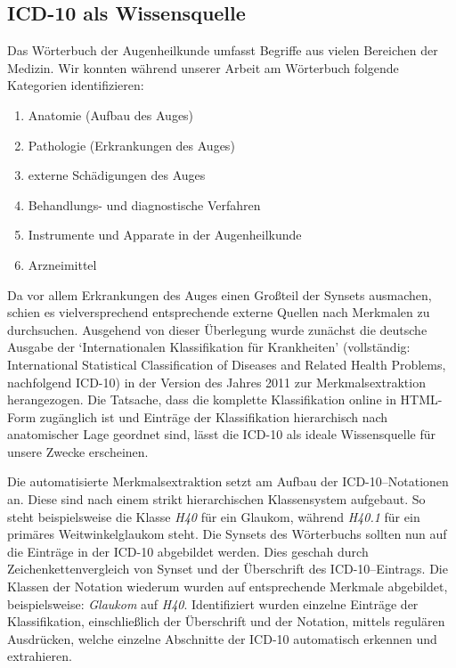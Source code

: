 \documentclass[pagesize,DIV=calc,12pt,draft]{scrreprt}
\begin{document}
\subsection{ICD-10 als Wissensquelle}

Das Wörterbuch der Augenheilkunde umfasst Begriffe aus vielen Bereichen der Medizin. 
Wir konnten während unserer Arbeit am Wörterbuch folgende Kategorien identifizieren: 

\begin{enumerate}
\item
 Anatomie (Aufbau des Auges)
\item
 Pathologie (Erkrankungen des Auges)
\item
 externe Schädigungen des Auges
\item
 Behandlungs- und diagnostische Verfahren
\item
 Instrumente und Apparate in der Augenheilkunde
\item
 Arzneimittel
\end{enumerate}

Da vor allem Erkrankungen des Auges einen Großteil der Synsets ausmachen, schien es vielversprechend entsprechende externe Quellen nach Merkmalen zu durchsuchen. 
Ausgehend von dieser Überlegung wurde zunächst die deutsche Ausgabe der `Internationalen Klassifikation für Krankheiten' (vollständig: International Statistical Classification of Diseases and Related Health Problems, nachfolgend ICD-10) in der Version des Jahres 2011 zur Merkmalsextraktion herangezogen. 
Die Tatsache, dass die komplette Klassifikation online in HTML-Form zugänglich ist und Einträge der Klassifikation hierarchisch nach anatomischer Lage geordnet sind, lässt die ICD-10 als ideale Wissensquelle für unsere Zwecke erscheinen. 

Die automatisierte Merkmalsextraktion setzt am Aufbau der ICD-10--Notationen an. 
Diese sind nach einem strikt hierarchischen Klassensystem aufgebaut. 
So steht beispielsweise die Klasse \emph{H40} für ein Glaukom, während \emph{H40.1} für ein primäres Weitwinkelglaukom steht. 
Die Synsets des Wörterbuchs sollten nun auf die Einträge in der ICD-10 abgebildet werden. 
Dies geschah durch Zeichenkettenvergleich von Synset und der Überschrift des ICD-10--Eintrags. 
Die Klassen der Notation wiederum wurden auf entsprechende Merkmale abgebildet, beispielsweise: \emph{Glaukom} auf \emph{H40}. 
Identifiziert wurden einzelne Einträge der Klassifikation, einschließlich der Überschrift und der Notation, mittels regulären Ausdrücken, welche einzelne Abschnitte der ICD-10 automatisch erkennen und extrahieren. 
\end{document}
